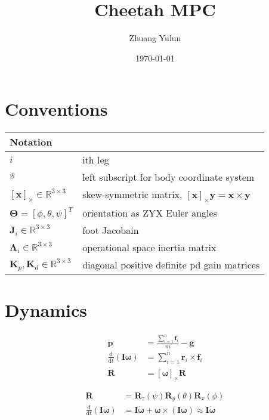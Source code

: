 \documentclass{article}
\title{Cheetah MPC}
\author{Zhuang Yulun}
\date{\today}
\begin{document}
\maketitle

\section{Conventions}


\begin{tabular}{l l}
    \hline
    Notation & \\
    \hline
    $ i$ & ith leg\\
    $_\mathcal B$ &left subscript for body coordinate system\\
    $[\mathbf x]_\times \in \mathbb R^{3\times 3}$ & skew-symmetric matrix, $[\mathbf x]_\times \mathbf y = \mathbf x \times \mathbf y$\\
    $\mathbf \Theta = [\phi, \theta, \psi]^T$ & orientation as ZYX Euler angles\\
    $\mathbf J_i\in \mathbb R^{3\times 3}$ & foot Jacobain\\
    $\mathbf\Lambda_i\in \mathbb R^{3\times 3}$ &operational space inertia matrix\\
    $\mathbf K_p, \mathbf K_d\in \mathbb R^{3\times 3}$ &diagonal positive definite pd gain matrices\\
    \hline

\end{tabular}

\section{Dynamics}

\begin{align}
    \ddot{\mathbf{p}} &=\frac{\sum_{i=1}^{n} \mathbf{f}_{i}}{m}-\mathbf{g} \\
    \frac{\mathrm{d}}{\mathrm{d} t}(\mathbf{I} \boldsymbol{\omega}) &=\sum_{i=1}^{n} \mathbf{r}_{i} \times \mathbf{f}_{i} \\
    \dot{\mathbf{R}} &=[\boldsymbol{\omega}]_{\times} \mathbf{R}
\end{align}

\begin{align}
    \mathbf{R} &=\mathbf{R}_{z}(\psi) \mathbf{R}_{y}(\theta) \mathbf{R}_{x}(\phi) \\
    \frac{\mathrm{d}}{\mathrm{d} t}(\mathbf{I} \boldsymbol{\omega}) &=\mathbf{I} \dot{\boldsymbol{\omega}}+\boldsymbol{\omega} \times(\mathbf{I} \boldsymbol{\omega}) \approx \mathbf{I} \dot{\boldsymbol{\omega}}
\end{align}
\end{document}
